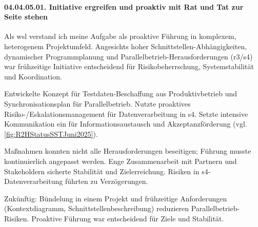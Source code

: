 \paragraph*{04.04.05.01. Initiative ergreifen und proaktiv mit Rat und Tat zur Seite stehen}
\label{para:04.04.05.01_InitiativeErgreifen}

\par Als \gls{wsl} verstand ich meine Aufgabe als proaktive Führung in komplexem, heterogenem Projektumfeld. Angesichts hoher Schnittstellen-Abhängigkeiten, dynamischer Programmplanung und Parallelbetrieb-Herausforderungen (\gls{r3}/\gls{s4}) war frühzeitige Initiative entscheidend für Risikobeherrschung, Systemstabilität und Koordination.

\par Entwickelte Konzept für Testdaten-Beschaffung aus Produktivbetrieb und Synchronisationsplan für Parallelbetrieb. Nutzte proaktives Risiko-/Eskalationsmanagement für Datenverarbeitung in \gls{s4}. Setzte intensive Kommunikation ein für Informationsaustausch und Akzeptanzförderung (vgl. \autoref{fig:R2HStatusSSTJuni2025}).

\par Maßnahmen konnten nicht alle Herausforderungen beseitigen; Führung musste kontinuierlich angepasst werden. Enge Zusammenarbeit mit Partnern und Stakeholdern sicherte Stabilität und Zielerreichung. Risiken in \gls{s4}-Datenverarbeitung führten zu Verzögerungen.

\par Zukünftig: Bündelung in einem Projekt und frühzeitige Anforderungen (Kontextdiagramm, Schnittstellenbeschreibung) reduzieren Parallelbetrieb-Risiken. Proaktive Führung war entscheidend für Ziele und Stabilität.